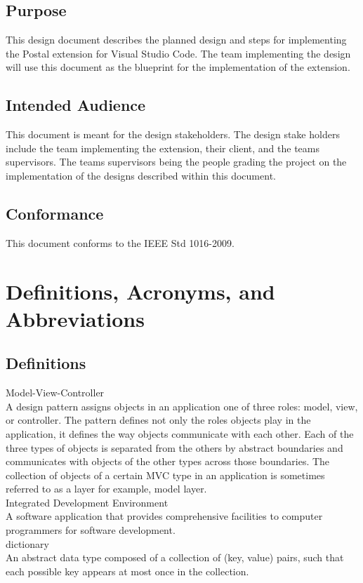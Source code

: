 \documentclass[letterpaper,10pt,titlepage,draftclsnofoot,onecolumn,onesided] {IEEEtran}
\begin{document}
\subsection{Purpose}
This design document describes the planned design and steps for implementing the Postal extension for Visual Studio Code. 
The team implementing the design will use this document as the blueprint for the implementation of the extension. 

\subsection{Intended Audience}
This document is meant for the design stakeholders. 
The design stake holders include the team implementing the extension, their client, and the teams supervisors. 
The teams supervisors being the people grading the project on the implementation of the designs described within this document.

\subsection{Conformance}
This document conforms to the IEEE Std 1016-2009.

\section{Definitions, Acronyms, and Abbreviations}

\subsection{Definitions}
Model-View-Controller\\
A design pattern assigns objects in an application one of three roles: model, view, or controller. 
The pattern defines not only the roles objects play in the application, it defines the way objects communicate with each other. 
Each of the three types of objects is separated from the others by abstract boundaries and communicates with objects of the other types across those boundaries. 
The collection of objects of a certain MVC type in an application is sometimes referred to as a layer for example, model layer.\cite{appleMVC} \\
Integrated Development Environment\\
A software application that provides comprehensive facilities to computer programmers for software development. \\
dictionary \\
An abstract data type composed of a collection of (key, value) pairs, such that each possible key appears at most once in the collection.
\end{document}
